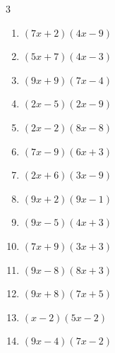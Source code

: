 \begin{multicols}{3}
\begin{enumerate}

  \item $(7x+2)(4x-9)$


  \item $(5x+7)(4x-3)$


  \item $(9x+9)(7x-4)$


  \item $(2x-5)(2x-9)$


  \item $(2x-2)(8x-8)$


  \item $(7x-9)(6x+3)$


  \item $(2x+6)(3x-9)$


\columnbreak %

\resetques

  \item $(9x+2)(9x-1)$


  \item $(9x-5)(4x+3)$


  \item $(7x+9)(3x+3)$


  \item $(9x-8)(8x+3)$


  \item $(9x+8)(7x+5)$


  \item $(x-2)(5x-2)$


  \item $(9x-4)(7x-2)$


\end{enumerate}
\end{multicols}
